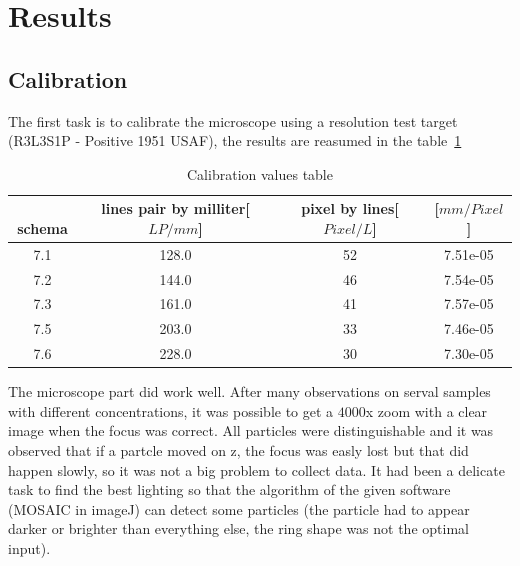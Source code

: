\documentclass[a4paper,12pt,twoside]{article}	%
\begin{document}
\section{Results}
\subsection{Calibration}
The first task is to calibrate the microscope using a resolution test target (R3L3S1P - Positive 1951 USAF), the results are reasumed in the table~\ref{tab:calibration}

\begin{table}[h!]
\centering
	\begin{tabular}{|c|c|c|c|}
		\hline
﻿		schema & lines pair by milliter[$LP/mm$]& pixel by lines[$Pixel/L$] & [$mm/Pixel$]\\
		\hline
		7.1	& 128.0	& 52 & 7.51e-05\\
		7.2	& 144.0	& 46 & 7.54e-05\\
		7.3	& 161.0	& 41 & 7.57e-05\\
		7.5	& 203.0	& 33 & 7.46e-05\\
		7.6	& 228.0	& 30 & 7.30e-05\\
		\hline
	\end{tabular}
	\caption{Calibration values table}
	\label{tab:calibration}
\end{table}

The microscope part did work well. After many observations on serval samples with different concentrations, it was possible to get a $4000 $x zoom with a clear image when the focus was correct. All particles were distinguishable and it was observed that if a partcle moved on z, the focus was easly lost but that did happen slowly, so it was not a big problem to collect data. It had been a delicate task to find the best lighting so that the algorithm of the given software (MOSAIC in imageJ) can detect some particles (the particle had to appear darker or brighter than everything else, the ring shape was not the optimal input).
\end{document}

